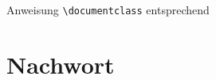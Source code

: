 Anweisung \verb|\documentclass| entsprechend
\begin{document}
  \tableofcontents
  \blinddocument
  \chapter*{Nachwort}
  \Blindtext[10]
  
\end{document}
